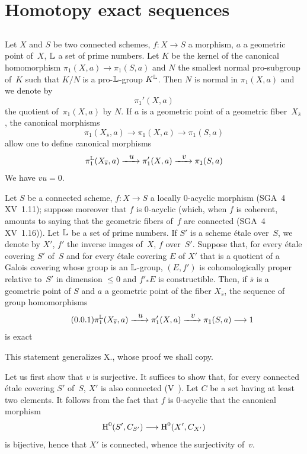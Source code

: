 \section{Homotopy exact sequences}\label{XIII.4}\setcounter{subsection}{-1}
\subsection{}
\label{XIII.4.0}
Let $X$ and $S$ be two connected schemes, $f\colon X\to S$ a
morphism, $a$ a geometric point of~$X$, $\mathbb{L}$ a set
of prime numbers. Let $K$ be the kernel of the canonical homomorphism
$\pi_1(X,a)\to\pi_1(S,a)$ and $N$ the smallest normal
pro-subgroup of~$K$ such that $K/N$ is a pro-$\mathbb{L}$-group
$K^{\mathbb{L}}$. Then $N$ is normal in $\pi_1(X,a)$ and we denote by
$$
\pi_1'(X,a)
$$
the
quotient of~$\pi_1(X,a)$ by $N$. If $a$ is a geometric
point of a geometric fiber~$X_{\bar{s}}$, the
canonical morphisms
$$
\pi_1(X_{\bar{s}},a)\to \pi_1(X,a) \to
\pi_1(S,a)
$$
allow one to define canonical morphisms
$$
\pi_1^{\LL}(X_{\bar{s}},a)\lto{u} \pi_1'(X,a) \lto{v} \pi_1(S,a)
$$
We have $vu=0$.

\begin{proposition}
\label{XIII.4.1}
Let $S$ be a connected scheme, $f\colon X\to S$ a
locally $0$-acyclic morphism \textup{(SGA~4 XV~1.11)}; suppose moreover
that $f$ is $0$-acyclic (which, when $f$ is coherent, amounts to
saying that the geometric fibers of~$f$ are connected \textup{(SGA~4
XV~1.16)}). Let $\mathbb{L}$ be a set of prime numbers. If $S'$ is a
scheme \'etale over~$S$, we denote by $X'$, $f'$ the inverse images
of~$X$, $f$ over~$S'$. Suppose that, for every \'etale covering
$S'$ of~$S$ and for every \'etale covering $E$ of
$X'$ that is a quotient of a Galois covering whose group is an
$\mathbb{L}$-group, $(E,f')$ is cohomologically proper relative
to~$S'$ in dimension $\leqslant 0$ and $f'_* E$ is
constructible. Then, if $\bar{s}$ is a geometric point of
$S$ and $a$ a geometric point of the fiber $X_{\bar{s}}$, the
sequence of group homomorphisms
\begin{equation*}
\label{eq:XIII.4.1.1}
\tag{\thesubsection.1}
\pi_1^{\LL}(X_{\bar{s}},a)\lto{u} \pi_1'(X,a)\lto{v}\pi_1(S,a)\to1
\end{equation*}
is exact
\end{proposition}

This statement generalizes X., whose proof we shall
copy.

Let us first show that $v$ is surjective. It suffices to show that, for
every connected \'etale covering $S'$ of~$S$, $X'$ is also
connected (V~). Let $C$ be a set having at least two
elements. It follows from the fact that $f$ is $0$-acyclic that
the canonical morphism
$$
\H^0(S',C_{S'})\to \H^0(X',C_{X'})
$$
is bijective, hence that $X'$ is connected, whence the surjectivity
of~$v$.

